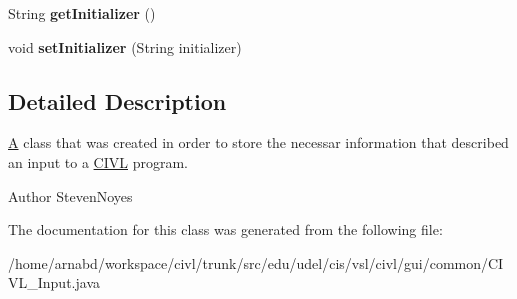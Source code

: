 \begin{DoxyCompactItemize}
\item 
\hypertarget{classedu_1_1udel_1_1cis_1_1vsl_1_1civl_1_1gui_1_1common_1_1CIVL__Input_a2a9123d1e36ae48bd2d9cf9c6019961c}{}String {\bfseries get\+Initializer} ()\label{classedu_1_1udel_1_1cis_1_1vsl_1_1civl_1_1gui_1_1common_1_1CIVL__Input_a2a9123d1e36ae48bd2d9cf9c6019961c}

\item 
\hypertarget{classedu_1_1udel_1_1cis_1_1vsl_1_1civl_1_1gui_1_1common_1_1CIVL__Input_a549a37ce6f0de643117f340b1232422c}{}void {\bfseries set\+Initializer} (String initializer)\label{classedu_1_1udel_1_1cis_1_1vsl_1_1civl_1_1gui_1_1common_1_1CIVL__Input_a549a37ce6f0de643117f340b1232422c}

\end{DoxyCompactItemize}


\subsection{Detailed Description}
\hyperlink{structA}{A} class that was created in order to store the necessar information that described an input to a \hyperlink{classedu_1_1udel_1_1cis_1_1vsl_1_1civl_1_1CIVL}{C\+I\+V\+L} program. 

\begin{DoxyAuthor}{Author}
Steven\+Noyes 
\end{DoxyAuthor}


The documentation for this class was generated from the following file\+:\begin{DoxyCompactItemize}
\item 
/home/arnabd/workspace/civl/trunk/src/edu/udel/cis/vsl/civl/gui/common/C\+I\+V\+L\+\_\+\+Input.\+java\end{DoxyCompactItemize}
